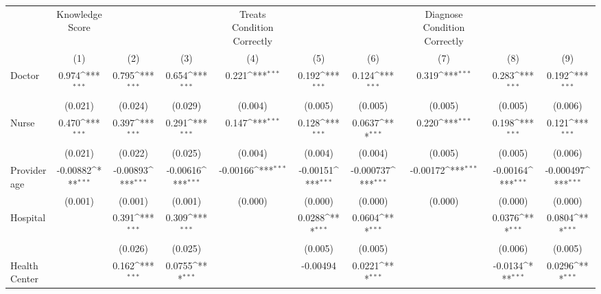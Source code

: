 {
\def\sym#1{\ifmmode^{#1}\else\(^{#1}\)\fi}
\begin{tabular}{l*{9}{c}}
\hline\hline
                &Knowledge Score         &                  &                  &Treats Condition Correctly         &                  &                  &Diagnose Condition Correctly         &                  &                  \\
                &\multicolumn{1}{c}{(1)}         &\multicolumn{1}{c}{(2)}         &\multicolumn{1}{c}{(3)}         &\multicolumn{1}{c}{(4)}         &\multicolumn{1}{c}{(5)}         &\multicolumn{1}{c}{(6)}         &\multicolumn{1}{c}{(7)}         &\multicolumn{1}{c}{(8)}         &\multicolumn{1}{c}{(9)}         \\
\hline
Doctor          &    0.974\sym{***}&    0.795\sym{***}&    0.654\sym{***}&    0.221\sym{***}&    0.192\sym{***}&    0.124\sym{***}&    0.319\sym{***}&    0.283\sym{***}&    0.192\sym{***}\\
                &  (0.021)         &  (0.024)         &  (0.029)         &  (0.004)         &  (0.005)         &  (0.005)         &  (0.005)         &  (0.005)         &  (0.006)         \\
Nurse           &    0.470\sym{***}&    0.397\sym{***}&    0.291\sym{***}&    0.147\sym{***}&    0.128\sym{***}&   0.0637\sym{***}&    0.220\sym{***}&    0.198\sym{***}&    0.121\sym{***}\\
                &  (0.021)         &  (0.022)         &  (0.025)         &  (0.004)         &  (0.004)         &  (0.004)         &  (0.005)         &  (0.005)         &  (0.006)         \\
Provider age    & -0.00882\sym{***}& -0.00893\sym{***}& -0.00616\sym{***}& -0.00166\sym{***}& -0.00151\sym{***}&-0.000737\sym{***}& -0.00172\sym{***}& -0.00164\sym{***}&-0.000497\sym{***}\\
                &  (0.001)         &  (0.001)         &  (0.001)         &  (0.000)         &  (0.000)         &  (0.000)         &  (0.000)         &  (0.000)         &  (0.000)         \\
Hospital        &                  &    0.391\sym{***}&    0.309\sym{***}&                  &   0.0288\sym{***}&   0.0604\sym{***}&                  &   0.0376\sym{***}&   0.0804\sym{***}\\
                &                  &  (0.026)         &  (0.025)         &                  &  (0.005)         &  (0.005)         &                  &  (0.006)         &  (0.005)         \\
Health Center   &                  &    0.162\sym{***}&   0.0755\sym{***}&                  & -0.00494         &   0.0221\sym{***}&                  &  -0.0134\sym{***}&   0.0296\sym{***}\\

\end{tabular}}
